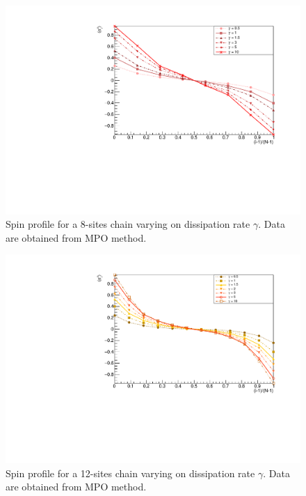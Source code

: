 \begin{figure}[H]
    \centering
    \includegraphics[scale=0.7]{Figures/8sites/8sites_LMvsGamma.pdf}
    \captionsetup{width=1.\linewidth}
    \caption{Spin profile for a 8-sites chain varying on dissipation rate $\gamma$. Data are obtained from MPO method.}
    \label{fig:8sites_LMvsGamma}
\end{figure}

\begin{figure}[H]
    \centering
    \includegraphics[scale=0.7]{Figures/12sites/12sites_LMvsGamma.pdf}
    \captionsetup{width=1.\linewidth}
    \caption{Spin profile for a 12-sites chain varying on dissipation rate $\gamma$. Data are obtained from MPO method.}
    \label{fig:12sites_LMvsGamma}
\end{figure}

